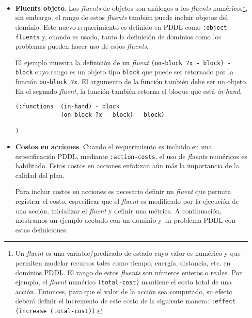 	\begin{itemize}
	
	\item {\bf Fluents objeto}. Los \emph{fluents} de objetos
        son an\'alogos a los \emph{fluents} num\'ericos\footnote{Un \emph{fluent} es una variable/predicado 
	de estado cuyo valor es num\'erico y que permiten
        modelar recursos tales como tiempo, energ\'ia,
        distancia, etc. en dominios PDDL. El rango de estos \emph{fluents}
        son n\'umeros enteros o reales. Por ejemplo, el \emph{fluent}
        num\'erico \texttt{(total-cost)} mantiene el costo total
        de una acci\'on. Entonces, para que el valor de la acci\'on sea computado, su efecto deber\'a
        definir el incremento de este costo de la siguiente manera:
        \texttt{:effect (increase (total-cost))}.}, sin embargo, el
        rango de estos \emph{fluents} tambi\'en puede incluir objetos
        del dominio.
	Este nuevo requerimiento es definido en PDDL como \texttt{:object-fluents} y,
	cuando es usado, tanto la definici\'on de
	dominios como los problemas pueden hacer uso de estos \emph{fluents}.
	
	\begin{ejemplo}%
	
	El ejemplo muestra la definici\'on de un \emph{fluent}
	\texttt{(on-block ?x - block) - block} cuyo rango es un objeto
        tipo \texttt{block} que puede ser retornado por la funci\'on
        \texttt{on-block ?x}. El argumento de la funci\'on tambi\'en
        debe ser un objeto. En el segundo \emph{fluent}, la funci\'on
        tambi\'en retorna el bloque que est\'a \emph{in-hand}.
	
	\begin{verbatim}  
(:functions  (in-hand) - block
             (on-block ?x - block) - block)

)
	\end{verbatim}
	\end{ejemplo}
	
	
	\item {\bf Costos en acciones}. Cuando el requerimiento es
	incluido en una especificaci\'on PDDL, mediante \texttt{:action-costs}, 
	el uso de \emph{fluents} num\'ericos es habilitado. Estos costos en
	acciones enfatizan a\'un m\'as la importancia de la calidad del plan.
	
	\begin{ejemplo}%
	
	Para incluir costos en acciones es necesario definir un \emph{fluent}
	que permita registrar el costo, especificar que el \emph{fluent} es
	modificado por la ejecuci\'on de una acci\'on, inicializar el \emph{fluent} y
	definir una m\'etrica. A continuaci\'on, mostramos un ejemplo acotado con un
	dominio y un problema PDDL con estas definiciones.
	

\end{ejemplo}
\end{itemize}
